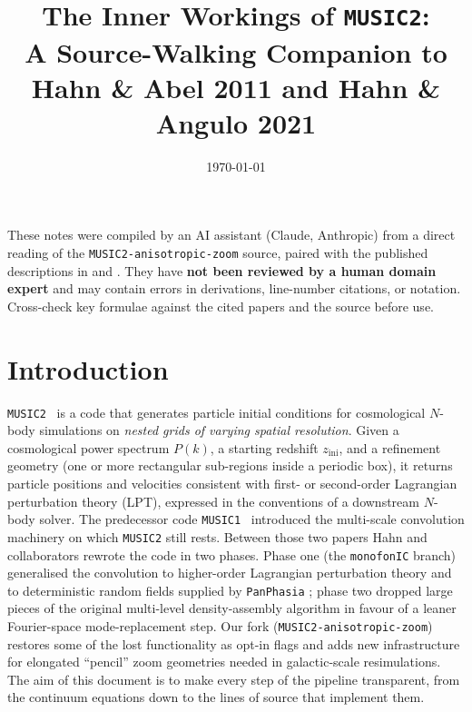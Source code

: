 \documentclass[12pt]{article}
\title{The Inner Workings of \texttt{MUSIC2}:\\
       A Source-Walking Companion to Hahn \& Abel 2011 and Hahn \& Angulo 2021}
\author{}
\date{\today}
\begin{document}
\maketitle
\tableofcontents
\newpage

\begin{tcolorbox}[colback=yellow!10!white, colframe=orange!75!black,
                  title={\bfseries Disclaimer}]
These notes were compiled by an AI assistant (Claude, Anthropic) from a
direct reading of the \texttt{MUSIC2-anisotropic-zoom} source, paired
with the published descriptions in \citet{Hahn2011} and
\citet{HahnAngulo2021}.  They have \textbf{not been reviewed by a human
domain expert} and may contain errors in derivations, line-number
citations, or notation.  Cross-check key formulae against the cited
papers and the source before use.
\end{tcolorbox}
\vspace{0.5em}

\section{Introduction}
\label{sec:intro}

\texttt{MUSIC2}~\citep{HahnAngulo2021} is a code that generates particle
initial conditions for cosmological $N$-body simulations on
\emph{nested grids of varying spatial resolution}.  Given a
cosmological power spectrum $P(k)$, a starting redshift $z_\mathrm{ini}$,
and a refinement geometry (one or more rectangular sub-regions inside
a periodic box), it returns particle positions and velocities consistent
with first- or second-order Lagrangian perturbation theory (LPT),
expressed in the conventions of a downstream $N$-body solver.  The
predecessor code \texttt{MUSIC1}~\citep{Hahn2011} introduced the
multi-scale convolution machinery on which \texttt{MUSIC2} still rests.
Between those two papers Hahn and collaborators rewrote the code in
two phases.  Phase one (the \texttt{monofonIC} branch) generalised the
convolution to higher-order Lagrangian perturbation theory and to
deterministic random fields supplied by \texttt{PanPhasia}
\citep{Jenkins2013}; phase two dropped large pieces of the original
multi-level density-assembly algorithm in favour of a leaner
Fourier-space mode-replacement step.  Our fork
(\texttt{MUSIC2-anisotropic-zoom}) restores some of the lost
functionality as opt-in flags and adds new infrastructure for
elongated ``pencil'' zoom geometries needed in galactic-scale
resimulations.  The aim of this document is to make every step of the
pipeline transparent, from the continuum equations down to the lines
of source that implement them.
\end{document}
